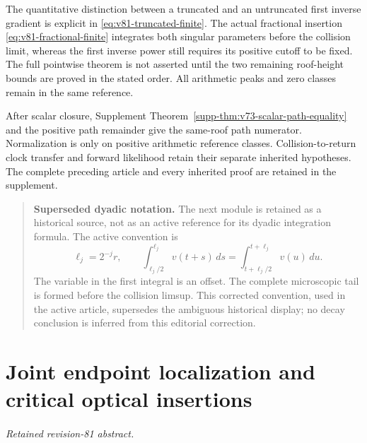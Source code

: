 \documentclass[11pt,reqno]{amsart}
\numberwithin{equation}{section}
\theoremstyle{definition}\newtheorem{definition}[theorem]{Definition}
\theoremstyle{remark}\newtheorem{remark}[theorem]{Remark}
\theoremstyle{definition}\newtheorem{inputstatement}[theorem]{Input statement}
\begin{document}
The quantitative distinction between a truncated and an untruncated
first inverse gradient is explicit in
\eqref{eq:v81-truncated-finite}. The actual fractional insertion
\eqref{eq:v81-fractional-finite} integrates both singular parameters
before the collision limit, whereas the first inverse power still
requires its positive cutoff to be fixed. The full pointwise theorem
is not asserted until the two remaining roof-height bounds are
proved in the stated order. All arithmetic peaks and zero classes
remain in the same reference.

After scalar closure, Supplement
Theorem~\ref{supp-thm:v73-scalar-path-equality} and the positive path
remainder give the same-roof path numerator. Normalization is only
on positive arithmetic reference classes. Collision-to-return clock
transfer and forward likelihood retain their separate inherited
hypotheses. The complete preceding article and every inherited proof
are retained in the supplement.

\begin{quote}\small
\textbf{Superseded dyadic notation.}
The next module is retained as a historical source, not as an active
reference for its dyadic integration formula. The active convention is
\[
 \ell_j=2^{-j}r,\qquad
 \int_{\ell_j/2}^{\ell_j}v(t+s)\,ds
   =\int_{t+\ell_j/2}^{t+\ell_j}v(u)\,du.
\]
The variable in the first integral is an offset. The complete microscopic
tail is formed before the collision limsup. This corrected convention,
used in the active article, supersedes the ambiguous historical display;
no decay conclusion is inferred from this editorial correction.
\end{quote}



\endgroup
\part{Joint endpoint localization and critical optical insertions}
\begingroup
\let\ArchiveLabel\label
\let\ArchiveRef\ref
\renewcommand{\label}[1]{\ArchiveLabel{v81archive:#1}}
\renewcommand{\ref}[1]{%
  \IfBeginWith{#1}{supp-}{%
    \StrBehind{#1}{supp-}[\ArchiveTarget]%
    \ArchiveRef{\ArchiveTarget}%
  }{\ArchiveRef{v81archive:#1}}%
}
\makeatletter
\let\ltx@label\label
\makeatother
\paragraph{Retained revision-81 abstract.}
\end{document}
